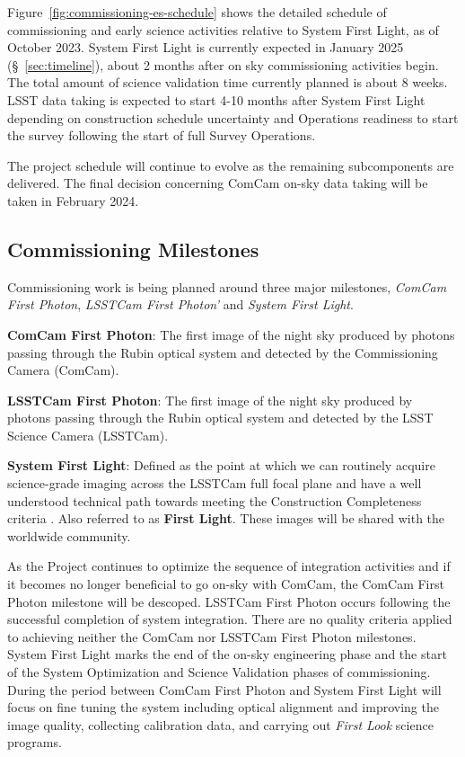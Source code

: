 Figure~\ref{fig:commissioning-es-schedule} shows the detailed schedule of commissioning and early science activities relative to System First Light, as of October 2023.
System First Light is currently expected in January 2025 (\S~\ref{sec:timeline}), about 2 months after on sky commissioning activities begin.
The total amount of science validation time currently planned is about 8 weeks.  
LSST data taking is expected to start 4-10 months after System First Light depending on construction schedule uncertainty and Operations readiness to start the survey following the start of full Survey Operations.

The project schedule will continue to evolve as the remaining subcomponents are delivered. 
The final decision concerning ComCam on-sky data taking will be taken in February 2024.

\subsection{Commissioning Milestones}
\label{ssec:commissioning-milestones}

Commissioning work is being planned around three major milestones, \textit{ComCam First Photon}, \textit{LSSTCam First Photon'} and \textit{System First Light}. 

\textbf{ComCam First Photon}: The first image of the night sky produced by photons passing through the Rubin optical system and detected by the Commissioning Camera (ComCam).

\textbf {LSSTCam First Photon}: The first image of the night sky produced by photons passing through the Rubin optical system and detected by the LSST Science Camera (LSSTCam).

\textbf {System First Light}: Defined as the point at which we can routinely acquire science-grade imaging across the LSSTCam full focal plane and have a well understood technical path towards meeting the Construction Completeness criteria   .
Also referred to as \textbf{First Light}. 
These images will be shared with the worldwide community. 

As the Project continues to optimize the sequence of integration activities and if it becomes no longer beneficial to go on-sky with ComCam, the ComCam First Photon milestone will be descoped. 
LSSTCam First Photon occurs following the successful completion of system integration. 
There are no quality criteria applied to achieving  neither the ComCam nor LSSTCam First Photon milestones. 
System First Light  marks the end of the  on-sky engineering phase and the start of the System Optimization and Science Validation phases of commissioning.
During the period between ComCam First Photon and System First Light will focus on fine tuning the system including optical alignment and improving the image quality, collecting calibration data, and carrying out \textit{First Look} science programs. 

